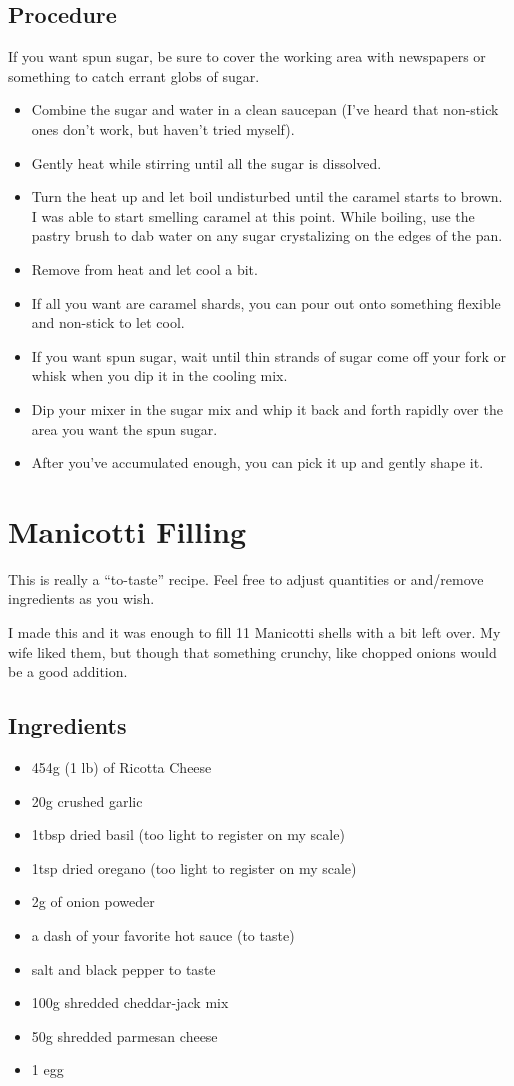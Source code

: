 \documentclass[10pt, openany]{book}
\begin{document}
\subsection{Procedure}
If you want spun sugar, be sure to cover the working area with newspapers or something to catch errant globs of sugar.
\begin{itemize}
  \item Combine the sugar and water in a clean saucepan (I've heard that non-stick ones don't work, but haven't tried myself).
  \item Gently heat while stirring until all the sugar is dissolved.
  \item Turn the heat up and let boil undisturbed until the caramel starts to brown.  I was able to start smelling caramel at this point.  While boiling, use the pastry brush to dab water on any sugar crystalizing on the edges of the pan.
  \item Remove from heat and let cool a bit.
  \item If all you want are caramel shards, you can pour out onto something flexible and non-stick to let cool.
  \item If you want spun sugar, wait until thin strands of sugar come off your fork or whisk when you dip it in the cooling mix.
  \item Dip your mixer in the sugar mix and whip it back and forth rapidly over the area you want the spun sugar.
  \item After you've accumulated enough, you can pick it up and gently shape it.
\end{itemize}

\section{Manicotti Filling}
\label{extra:ManicottFilling}
This is really a ``to-taste'' recipe.  Feel free to adjust quantities or and/remove ingredients as you wish.

I made this and it was enough to fill 11 Manicotti shells with a bit left over.  My wife liked them, but though that something crunchy, like chopped onions would be a good addition.

\subsection{Ingredients}
\begin{itemize}
  \item 454g (1 lb) of Ricotta Cheese
  \item 20g crushed garlic
  \item 1tbsp dried basil (too light to register on my scale)
  \item 1tsp dried oregano (too light to register on my scale)
  \item 2g of onion poweder
  \item a dash of your favorite hot sauce (to taste)
  \item salt and black pepper to taste
  \item 100g shredded cheddar-jack mix
  \item 50g shredded parmesan cheese
  \item 1 egg
\end{itemize}
\end{document}
